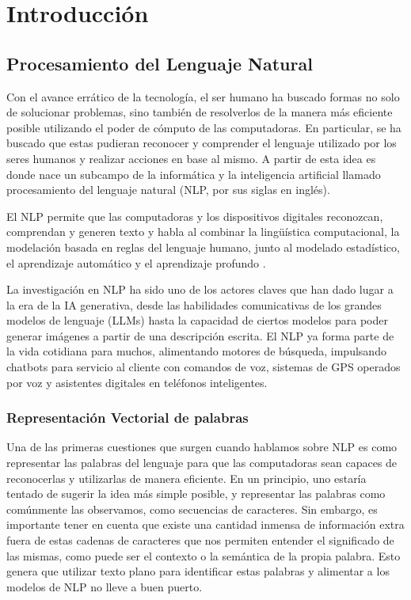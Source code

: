 \chapter{Introducción}

\section{Procesamiento del Lenguaje Natural}

Con el avance errático de la tecnología, el ser humano ha buscado formas no solo de solucionar 
problemas, sino también de resolverlos de la manera más eficiente posible utilizando 
el poder de cómputo de las computadoras. En particular, se ha buscado que estas 
pudieran reconocer y comprender el lenguaje utilizado por los seres humanos y 
realizar acciones en base al mismo. A partir de esta idea es donde nace un subcampo 
de la informática y la inteligencia artificial llamado procesamiento del lenguaje natural (NLP, por sus siglas en inglés).

El NLP permite que las computadoras y los dispositivos digitales reconozcan, comprendan y generen texto y habla al combinar la lingüística computacional, la modelación basada en reglas del lenguaje humano, junto al modelado estadístico, el aprendizaje automático y el aprendizaje profundo \parencite{jurafsky2000speech}.

La investigación en NLP ha sido uno de los actores claves que han dado lugar a la era de la IA generativa, desde las habilidades comunicativas de los grandes modelos de lenguaje (LLMs) hasta la capacidad de ciertos modelos para poder generar imágenes a partir de una descripción escrita. El NLP ya forma parte de la vida cotidiana para muchos, alimentando motores de búsqueda, impulsando chatbots para servicio al cliente con comandos de voz, sistemas de GPS operados por voz y asistentes digitales en teléfonos inteligentes.

\subsection{Representación Vectorial de palabras}

Una de las primeras cuestiones que surgen cuando hablamos sobre NLP es como representar las palabras del lenguaje para que las computadoras sean capaces de reconocerlas y utilizarlas de manera eficiente. En un principio, uno estaría tentado de sugerir la idea más simple posible, y representar las palabras como comúnmente las observamos, como secuencias de caracteres. Sin embargo, es importante tener en cuenta que existe una cantidad inmensa de información extra fuera de estas cadenas de caracteres que nos permiten entender el significado de las mismas, como puede ser el contexto o la semántica de la propia palabra. Esto genera que utilizar texto plano para identificar estas palabras y alimentar a los modelos de NLP no lleve a buen puerto.

